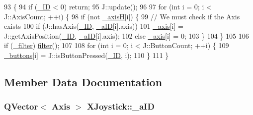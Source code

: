 \begin{DoxyCode}
93 \{
94     \textcolor{keywordflow}{if} (\hyperlink{class_x_joystick_a9916e0cad47852ca6fedcac461c3457b}{\_ID} < 0) \textcolor{keywordflow}{return};
95     J::update();
96     
97     \textcolor{keywordflow}{for} (\textcolor{keywordtype}{int} i = 0; i < J::AxisCount; ++i) \{
98         \textcolor{keywordflow}{if} (not \hyperlink{class_x_joystick_a98105f2ba9654c2d1fd42b58fb689533}{\_axisH}[i]) \{
99             \textcolor{comment}{// We must check if the Axis exists}
100             \textcolor{keywordflow}{if} (J::hasAxis(\hyperlink{class_x_joystick_a9916e0cad47852ca6fedcac461c3457b}{\_ID}, \hyperlink{class_x_joystick_ac1bab2d7ac8c682fab73f855653bfe24}{\_aID}[i].axis)) 
101                 \hyperlink{class_x_joystick_aa81258bbab92ce6946d0f25e6da521a7}{\_axis}[i] = J::getAxisPosition(\hyperlink{class_x_joystick_a9916e0cad47852ca6fedcac461c3457b}{\_ID}, \hyperlink{class_x_joystick_ac1bab2d7ac8c682fab73f855653bfe24}{\_aID}[i].axis);
102             \textcolor{keywordflow}{else} \hyperlink{class_x_joystick_aa81258bbab92ce6946d0f25e6da521a7}{\_axis}[i] = 0;
103         \}
104     \}
105         
106     \textcolor{keywordflow}{if} (\hyperlink{class_x_joystick_ab209883db3b333014323cba17123bb9b}{\_filter}) \hyperlink{class_x_joystick_a49901d35007803e1d88cf3eb382e4473}{filter}();
107     
108     \textcolor{keywordflow}{for} (\textcolor{keywordtype}{int} i = 0; i < J::ButtonCount; ++i) \{
109         \hyperlink{class_x_joystick_a2067117adaa8161d974e6c2bb9776ec3}{\_buttons}[i] = J::isButtonPressed(\hyperlink{class_x_joystick_a9916e0cad47852ca6fedcac461c3457b}{\_ID}, i);
110     \}
111 \}
\end{DoxyCode}


\subsection{Member Data Documentation}
\hypertarget{class_x_joystick_ac1bab2d7ac8c682fab73f855653bfe24}{}
\subsubsection[{\+\_\+a\+I\+D}]{\setlength{\rightskip}{0pt plus 5cm}Q\+Vector$<$ {\bf Axis} $>$ X\+Joystick\+::\+\_\+a\+I\+D\hspace{0.3cm}{\ttfamily [private]}}\label{class_x_joystick_ac1bab2d7ac8c682fab73f855653bfe24}


